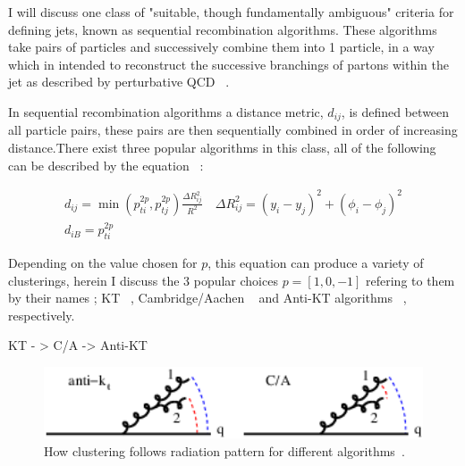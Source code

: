 I will discuss one class of "suitable, though fundamentally ambiguous" criteria for defining jets, known as sequential recombination algorithms. These algorithms take pairs of particles and successively combine them into 1 particle, in a way which in intended to reconstruct the successive branchings of partons within the jet as described by perturbative QCD ~\cite{Marzani:2019hun}.
 
In sequential recombination algorithms a distance metric, $d_{ij}$, is defined between all particle pairs, these pairs are then sequentially combined in order of increasing distance.There exist three popular  algorithms in this class, all of the following can be described by the equation ~\cite{Ellis:1993tq}:


\begin{equation}
\begin{array}{l}{d_{i j}=\min \left(p_{t i}^{2 p}, p_{t j}^{2 p}\right) \frac{\Delta R_{i j}^{2}}{R^{2}} \quad \Delta R_{i j}^{2}=\left(y_{i}-y_{j}\right)^{2}+\left(\phi_{i}-\phi_{j}\right)^{2}} \\ {d_{i B}=p_{t i}^{2 p}}\end{array}
\end{equation}


Depending on the value chosen for $p$, this equation can produce a variety of clusterings, herein I discuss the 3 popular choices $p = [1, 0, -1]$ refering to them by their names ; KT ~\cite{Ellis:1993tq}, Cambridge/Aachen ~\cite{Dokshitzer:1997in} and Anti-KT algorithms ~\cite{Cacciari:2008gp}, respectively.









KT - > C/A -> Anti-KT
\cite{Tseng:2013dva}



\begin{figure}[htb]
\centering
\includegraphics[width=1.0\textwidth]{visuals/config-antikt-double-lund.png}
\caption{How clustering follows radiation pattern for different algorithms~\cite{Dreyer:2018nbf}.}
\label{fig:lund}
\end{figure}

